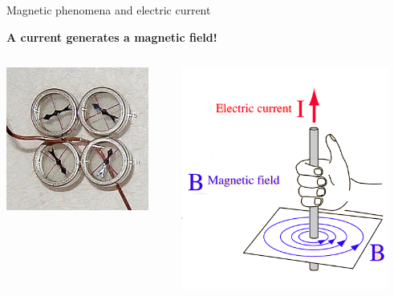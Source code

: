 \begin{frame}{Magnetic phenomena and electric current}

{\bf A current generates a magnetic field!}\\

\begin{columns}
  \begin{column}{0.50\textwidth}
    \begin{center}
      \includegraphics[width=0.90\textwidth]{./images/photos/compass_deflection_wire_current_up.jpg}\\
    \end{center}
  \end{column}
  \begin{column}{0.50\textwidth}
    \begin{center}
      \includegraphics[width=0.90\textwidth]{./images/schematics/magnetic_field_around_wire_01.png}\\

\end{center}
\end{column}
\end{columns}
\end{frame}
